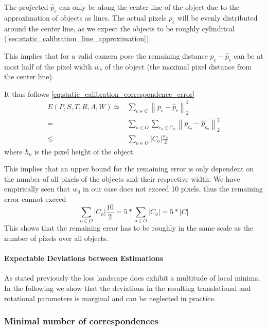 The projected $\hat{p}_c$ can only be along the center line of the object due to the approximation of objects as lines.
The actual pixels $p_c$ will be evenly distributed around the center line, as we expect the objects to be roughly cylindrical (\autoref{sec:static_calibration_line_approximation}).

This implies that for a valid camera pose the remaining distance $p_c - \hat{p}_c$ can be at most half of the pixel width $w_s$ of the object (the maximal pixel distance from the center line).

It thus follows \autoref{eq:static_calibration_correspondence_error} 
\begin{equation}
  \label{eq:static_calibration_correspondence_error_scale}
  \begin{split}
  E(P, S, T, R, \Lambda, W ) \simeq  &
  \sum_{c \in C} 
  \left\lVert 
     p_c - \hat{p}_c 
  \right\rVert_2^2 \\
  = & 
  \sum_{o \in O} 
  \sum_{c_o \in C_o} 
  \left\lVert 
     p_{c_o} - \hat{p}_{c_o} 
  \right\rVert_2^2 \\
  \leq &
  \sum_{o \in O} \left\lvert C_o \right\rvert \frac{w_o}{2} 
  \end{split}
\end{equation}
where $h_o$ is the pixel height of the object.

This implies that an upper bound for the remaining error is only dependent on the number of all pixels of the objects and their respective width.
We have empirically seen that $w_0$ in our case does not exceed 10 pixels, thus the remaining error cannot exceed 
\begin{equation}
  \sum_{o \in O} \left\lvert C_o \right\rvert \frac{10}{2} = 5 * \sum_{o \in O} \left\lvert C_o \right\rvert = 5 * \left\lvert C \right\rvert 
\end{equation}
This shows that the remaining error has to be roughly in the same scale as the number of pixels over all objects. 

\paragraph{Expectable Deviations between Estimations}
As stated previously the loss landscape does exhibit a multitude of local minima. 
In the following we show that the deviations in the resulting translational and rotational parameters is marginal and can be neglected in practice.



\subsubsection{Minimal number of correspondences}

\label{sec:static_calibration_expectable_error}